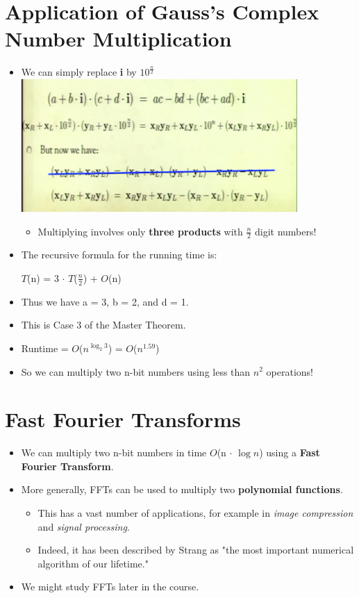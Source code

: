 \documentclass[12pt]{article}
\begin{document}
\section{Application of Gauss's Complex Number Multiplication}
\renewcommand{\labelitemii}{$\circ$}
\renewcommand{\labelitemiii}{$\cdot$}
\renewcommand{\labelitemiii}{$\rightarrow$}
\begin{itemize}
\item We can simply replace \textbf{i} by $10^{\frac{n}{2}}$\\
\includegraphics{lecture44}
	\begin{itemize}
	\item Multiplying involves only \textbf{three products} with ${\frac{n}{2}}$ digit numbers!
	\end{itemize}
\item The recursive formula for the running time is: 

	\hspace*{\fill} $T$(n) = 3 $\cdot$ $T$($\frac{n}{2}$) + $O$(n)\hspace*{\fill} 
	
\item Thus we have a = 3, b = 2, and d = 1.
\item This is Case 3 of the Master Theorem.
\item Runtime = $O$($n^{\log_2 3}$) = $O$($n^{1.59}$)
\item So we can multiply two n-bit numbers using less than $n^2$ operations!
\end{itemize}

\section{Fast Fourier Transforms}
\renewcommand{\labelitemii}{$\circ$}
\renewcommand{\labelitemiii}{$\cdot$}
\renewcommand{\labelitemiii}{$\rightarrow$}
\begin{itemize}
\item We can multiply two n-bit numbers in time $O$(n $\cdot$ $\log{}n$) using a \textbf{Fast Fourier Transform}.
\item More generally, FFTs can be used to multiply two \textbf{polynomial functions}.
	\begin{itemize}
	\item This has a vast number of applications, for example in \textit{image compression} and \textit{signal processing}.
	\item Indeed, it has been described by Strang as "the most important numerical algorithm of our lifetime."
	\end{itemize}
\item We might study FFTs later in the course.
\end{itemize}
\end{document}

